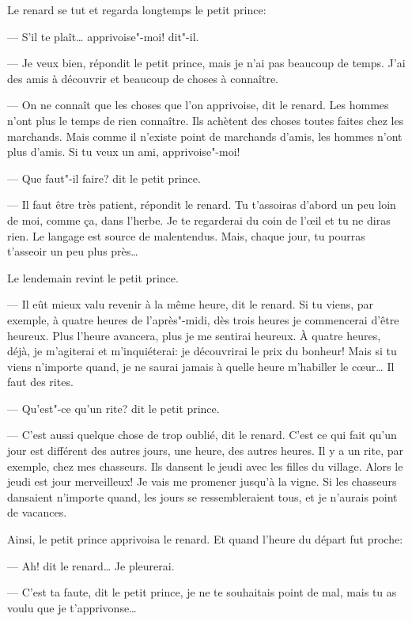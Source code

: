 \begin{Parallel}[p]{}{}
{Le renard se tut et regarda longtemps le petit prince:

--- S'il te plaît\ldots{} apprivoise"-moi! dit"-il.

--- Je veux bien, répondit le petit prince, mais je
n'ai pas beaucoup de temps. J'ai des amis à découvrir et beaucoup de choses à connaître.

--- On ne connaît que les choses que l'on apprivoise, dit le renard. Les hommes n'ont plus le temps
de rien connaître. Ils achètent des choses toutes
faites chez les marchands. Mais comme il n'existe
point de marchands d'amis, les hommes n'ont plus
d'amis. Si tu veux un ami, apprivoise"-moi!

--- Que faut"-il faire? dit le petit prince.

--- Il faut être très patient, répondit le renard. Tu
t'assoiras d'abord un peu loin de moi, comme ça,
dans l'herbe. Je te regarderai du coin de l'œil et tu
ne diras rien. Le langage est source de malentendus.
Mais, chaque jour, tu pourras t'asseoir un peu plus
près\ldots{}

Le lendemain revint le petit prince.

--- Il eût mieux valu revenir à la même heure, dit
le renard. Si tu viens, par exemple, à quatre heures
de l'après"-midi, dès trois heures je commencerai
d'être heureux. Plus l'heure avancera, plus je me
sentirai heureux. À quatre heures, déjà, je m'agiterai et m'inquiéterai: je découvrirai le prix du bonheur! Mais si tu viens n'importe quand, je ne saurai jamais à quelle heure m'habiller le cœur\ldots{} Il faut
des rites.

--- Qu'est"-ce qu'un rite? dit le petit prince.

--- C'est aussi quelque chose de trop oublié, dit le
renard. C'est ce qui fait qu'un jour est différent des
autres jours, une heure, des autres heures. Il y a un
rite, par exemple, chez mes chasseurs. Ils dansent le
jeudi avec les filles du village. Alors le jeudi est jour
merveilleux! Je vais me promener jusqu'à la vigne.
Si les chasseurs dansaient n'importe quand, les jours
se ressembleraient tous, et je n'aurais point de
vacances.

\medskip

Ainsi, le petit prince apprivoisa le renard. Et
quand l'heure du départ fut proche:

--- Ah! dit le renard\ldots{} Je pleurerai.

--- C'est ta faute, dit le petit prince, je ne te souhaitais point de mal, mais tu as voulu que je t'apprivonse\ldots{}

}
\end{Parallel}
